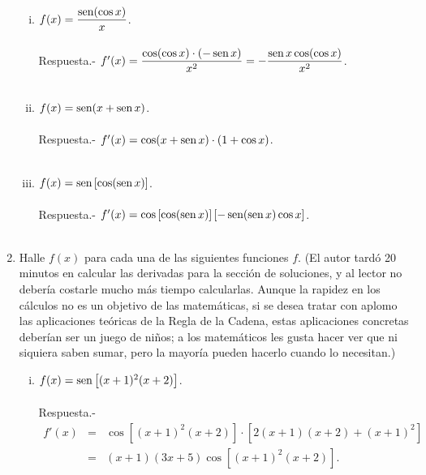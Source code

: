 \begin{enumerate}[\bfseries 1.]
\begin{enumerate}[(i)]
	    \item $f(x)=\dfrac{\mathop{\mbox{\normalfont sen}}\nolimits(\cos x)}{x}$.\\\\
		Respuesta.-\; $f'(x)=\dfrac{\cos(\cos x)\cdot (-\mathop{\mbox{\normalfont sen}}\nolimits x)}{x^2}=-\dfrac{\mathop{\mbox{\normalfont sen}}\nolimits x \cos(\cos x)}{x^2}$.\\\\

	    \item $f(x)=\mathop{\mbox{\normalfont sen}}\nolimits(x+\mathop{\mbox{\normalfont sen}}\nolimits x)$.\\\\
		Respuesta.-\; $f'(x)=\cos(x+\mathop{\mbox{\normalfont sen}}\nolimits x)\cdot (1+\cos x)$.\\\\

	    \item $f(x)=\mathop{\mbox{\normalfont sen}}\nolimits\left[\cos(\mathop{\mbox{\normalfont sen}}\nolimits x)\right]$.\\\\
		Respuesta.-\; $f'(x)=\cos\left[\cos(\mathop{\mbox{\normalfont sen}}\nolimits x)\right]\left[-\mathop{\mbox{\normalfont sen}}\nolimits(\mathop{\mbox{\normalfont sen}}\nolimits x)\cos x\right]$.\\\\

	\end{enumerate}

    \item Halle $f(x)$ para cada una de las siguientes funciones $f.$ (El autor tardó 20 minutos en calcular las derivadas para la sección de soluciones, y al lector no debería costarle mucho más tiempo calcularlas. Aunque la rapidez en los cálculos no es un objetivo de las matemáticas, si se desea tratar con aplomo las aplicaciones teóricas de la Regla de la Cadena, estas aplicaciones concretas deberían ser un juego de niños; a los matemáticos les gusta hacer ver que ni siquiera saben sumar, pero la mayoría pueden hacerlo cuando lo necesitan.)\\

	\begin{enumerate}[(i)]

	    \item $f(x)=\mathop{\mbox{\normalfont sen}}\nolimits \left[(x+1)^2(x+2)\right]$.\\\\
		Respuesta.-\; 
		$$\begin{array}{rcl}
		f'(x)&=&\cos\left[(x+1)^2(x+2)\right]\cdot \left[2(x+1)(x+2)+(x+1)^2\right]\\
		     &=&(x+1)(3x+5)\cos\left[(x+1)^2(x+2)\right].\\
		\end{array}$$
		\vspace{0.7cm}


\end{enumerate}
\end{enumerate}
